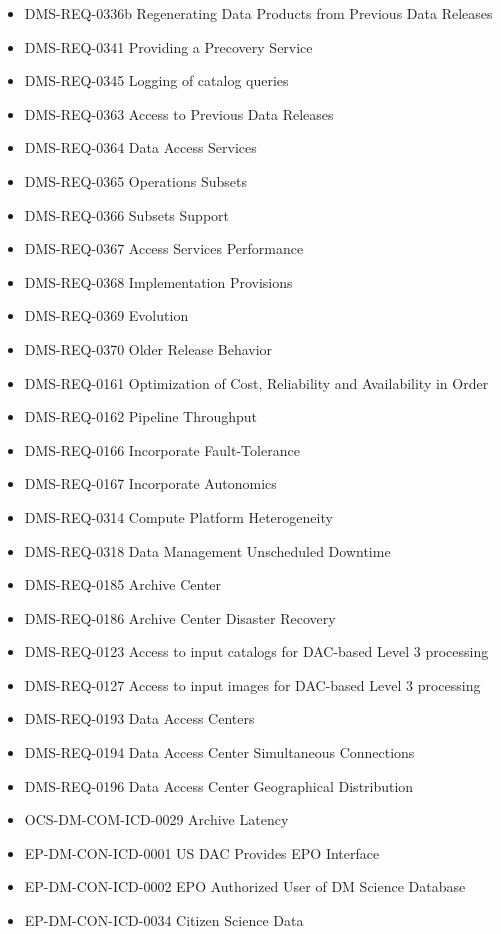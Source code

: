 \begin{itemize}
\item DMS-REQ-0336b Regenerating Data Products from Previous Data Releases
\item DMS-REQ-0341 Providing a Precovery Service
\item DMS-REQ-0345 Logging of catalog queries
\item DMS-REQ-0363 Access to Previous Data Releases
\item DMS-REQ-0364 Data Access Services
\item DMS-REQ-0365 Operations Subsets
\item DMS-REQ-0366 Subsets Support
\item DMS-REQ-0367 Access Services Performance
\item DMS-REQ-0368 Implementation Provisions
\item DMS-REQ-0369 Evolution
\item DMS-REQ-0370 Older Release Behavior
\item DMS-REQ-0161 Optimization of Cost, Reliability and Availability in Order
\item DMS-REQ-0162 Pipeline Throughput
\item DMS-REQ-0166 Incorporate Fault-Tolerance
\item DMS-REQ-0167 Incorporate Autonomics
\item DMS-REQ-0314 Compute Platform Heterogeneity
\item DMS-REQ-0318 Data Management Unscheduled Downtime
\item DMS-REQ-0185 Archive Center
\item DMS-REQ-0186 Archive Center Disaster Recovery
\item DMS-REQ-0123 Access to input catalogs for DAC-based Level 3 processing
\item DMS-REQ-0127 Access to input images for DAC-based Level 3 processing
\item DMS-REQ-0193 Data Access Centers
\item DMS-REQ-0194 Data Access Center Simultaneous Connections
\item DMS-REQ-0196 Data Access Center Geographical Distribution
\item OCS-DM-COM-ICD-0029 Archive Latency
\item EP-DM-CON-ICD-0001 US DAC Provides EPO Interface
\item EP-DM-CON-ICD-0002 EPO Authorized User of DM Science Database
\item EP-DM-CON-ICD-0034 Citizen Science Data
\end{itemize}
